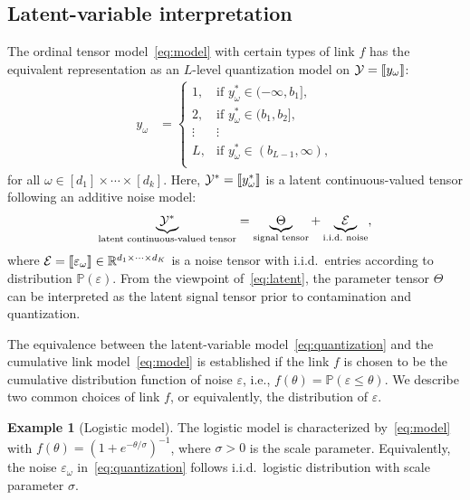 \documentclass[11pt]{article}
\theoremstyle{plain}
\theoremstyle{definition}
\newtheorem{example}{Example}
\newcommand*{\KeepStyleUnderBrace}[1]{%
 \mathop{%
    \mathchoice
    {\underbrace{\displaystyle#1}}%
    {\underbrace{\textstyle#1}}%
    {\underbrace{\scriptstyle#1}}%
    {\underbrace{\scriptscriptstyle#1}}%
  }\limits
}
\providecommand{\DIFaddbegin}{} %
\begin{document}
\subsection{Latent-variable interpretation}\label{sec:latent}
The ordinal tensor model~\eqref{eq:model} with certain types of link $f$ has the equivalent representation as an $L$-level quantization model on $\mathcal{Y}=\llbracket y_\omega \rrbracket$:
\begin{align}\label{eq:quantization}
y_\omega&=
\begin{cases}
1,& \text{if $y^*_\omega\in(-\infty, b_1]$},\\
2,& \text{if $y^*_\omega\in(b_1, b_2]$},\\
\vdots  &\vdots\\
L,& \text{if $y^*_\omega\in(b_{L-1}, \infty)$},\\
\end{cases}
\end{align}
for all $\omega\in[d_1]\times \cdots \times [d_k]$. Here, $\mathcal{Y}^*=\llbracket y^*_\omega \rrbracket$ is a latent continuous-valued tensor following an additive noise model:
\begin{align}\label{eq:latent}
\KeepStyleUnderBrace{\tY^*}_{\text{latent continuous-valued tensor}}=\KeepStyleUnderBrace{\Theta}_{\text{signal tensor}}+\KeepStyleUnderBrace{\tE}_{\text{i.i.d.\ noise}},
\end{align}
where $\mathcal{E}=\llbracket \varepsilon_\omega \rrbracket\in\mathbb{R}^{d_1\times \cdots \times d_K}$ is a noise tensor with i.i.d.\ entries according to distribution $\mathbb{P}(\varepsilon)$. From the viewpoint of~\eqref{eq:latent}, the parameter tensor $\Theta$ can be interpreted as the latent signal tensor prior to contamination and quantization.

The equivalence between the latent-variable model~\eqref{eq:quantization} and the cumulative link model~\eqref{eq:model} is established if the link $f$ is chosen to be the cumulative distribution function of noise $\varepsilon$, i.e., $f(\theta)=\mathbb{P}(\varepsilon\leq \theta)$. We describe two common choices of link $f$, or equivalently, the distribution of $\varepsilon$.

\begin{example}[Logistic model] The logistic model is characterized by~\eqref{eq:model} with $f(\theta)=(1+e^{-\theta/\sigma})^{-1}$, where $\sigma>0$ is the scale parameter. Equivalently, the noise $\varepsilon_\omega$ in~\eqref{eq:quantization} follows i.i.d.\ logistic distribution with scale parameter $\sigma$.
\end{example}
\DIFaddbegin 
\end{document}
